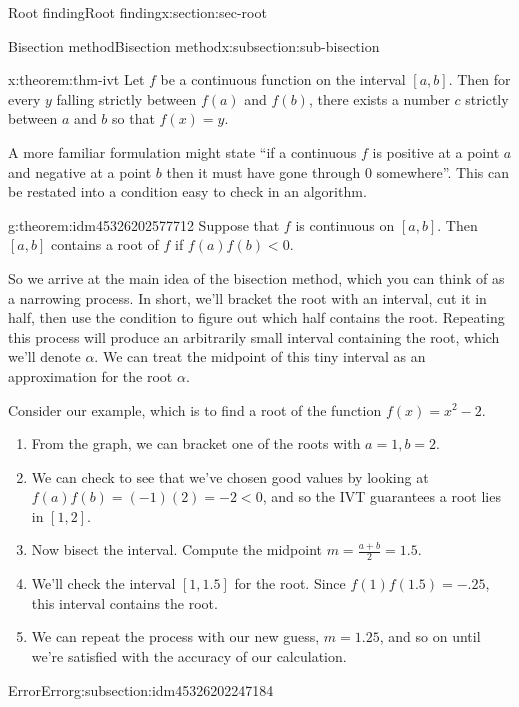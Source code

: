 \documentclass[oneside,10pt,]{article}
\numberwithin{equation}{section}
\numberwithin{equation}{section}
\newcommand{\lt}{<}
\begin{document}
\begin{sectionptx}{Root finding}{}{Root finding}{}{}{x:section:sec-root}
\begin{subsectionptx}{Bisection method}{}{Bisection method}{}{}{x:subsection:sub-bisection}
\begin{theorem}{}{}{x:theorem:thm-ivt}%
Let \(f\) be a continuous function on the interval \([a,b]\). Then for every \(y\) falling strictly between \(f(a)\) and \(f(b)\), there exists a number \(c\) strictly between \(a\) and \(b\) so that \(f(x) = y\).%
\end{theorem}
A more familiar formulation might state ``if a continuous \(f\) is positive at a point \(a\) and negative at a point \(b\) then it must have gone through 0 somewhere''. This can be restated into a condition easy to check in an algorithm.%
\begin{theorem}{}{}{g:theorem:idm45326202577712}%
Suppose that \(f\) is continuous on \([a,b]\). Then \([a,b]\) contains a root of \(f\) if \(f(a)f(b) \lt 0\).%
\end{theorem}
So we arrive at the main idea of the bisection method, which you can think of as a narrowing process. In short, we'll bracket the root with an interval, cut it in half, then use the condition to figure out which half contains the root. Repeating this process will produce an arbitrarily small interval containing the root, which we'll denote \(\alpha\). We can treat the midpoint of this tiny interval as an approximation for the root \(\alpha\).%
\par
Consider our example, which is to find a root of the function \(f(x) = x^2 - 2\).%
\begin{enumerate}
\item{}From the graph, we can bracket one of the roots with \(a = 1, b = 2\).%
\item{}We can check to see that we've chosen good values by looking at \(f(a)f(b) = (-1)(2) = -2 \lt 0\), and so the IVT guarantees a root lies in \([1,2]\).%
\item{}Now bisect the interval. Compute the midpoint \(m = \frac{a+b}{2} = 1.5\).%
\item{}We'll check the interval \([1, 1.5]\) for the root. Since \(f(1)f(1.5) = -.25\), this interval contains the root.%
\item{}We can repeat the process with our new guess, \(m = 1.25\), and so on until we're satisfied with the accuracy of our calculation.%
\end{enumerate}
%
\end{subsectionptx}
%
%
\typeout{************************************************}
\typeout{************************************************}
%
\begin{subsectionptx}{Error}{}{Error}{}{}{g:subsection:idm45326202247184}

\end{subsectionptx}
\end{sectionptx}
\end{document}
